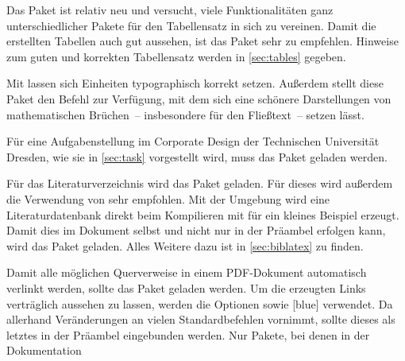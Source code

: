 \documentclass[%
  english,ngerman,%
  geometry=no,DIV=12,automark,%
]{tudscrartcl}
\begin{document}
%
\begin{Tutorial*}
\usepackage{fixltx2e}
\end{Tutorial*}
%
Das Paket  ist relativ neu und versucht, viele Funktionalitäten 
ganz unterschiedlicher Pakete für den Tabellensatz in sich zu vereinen. Damit 
die erstellten Tabellen auch gut aussehen, ist das Paket  
sehr zu empfehlen. Hinweise zum guten und korrekten Tabellensatz werden in 
\autoref{sec:tables} gegeben.
%
\begin{Tutorial*}
\usepackage{tabu}
\usepackage{booktabs}
\end{Tutorial*}
%
Mit  lassen sich Einheiten typographisch korrekt setzen. 
Außerdem stellt diese Paket den Befehl  zur Verfügung, mit dem 
sich eine schönere Darstellungen von mathematischen Brüchen~-- insbesondere für 
den Fließtext~-- setzen lässt.
%
\begin{Tutorial*}
\usepackage{units}
\end{Tutorial*}
%
Für eine Aufgabenstellung im Corporate Design der Technischen Universität 
Dresden, wie sie in \autoref{sec:task} vorgestellt wird, muss das Paket 
 geladen werden.
%
\begin{Tutorial*}
\usepackage{tudscrsupervisor}
\end{Tutorial*}
%
Für das Literaturverzeichnis wird das Paket  geladen. Für 
dieses wird außerdem die Verwendung von  sehr empfohlen. Mit 
der Umgebung  wird eine Literaturdatenbank 
 direkt beim Kompilieren mit  für ein 
kleines Beispiel erzeugt. Damit dies im Dokument selbst und nicht nur in der 
Präambel erfolgen kann, wird das Paket  geladen. Alles 
Weitere dazu ist in \autoref{sec:biblatex} zu finden.
%
\begin{Tutorial*}
\usepackage{csquotes}
\usepackage[backend=biber,style=alphabetic]{biblatex}
\usepackage{filecontents}

\end{Tutorial*}
%
Damit alle möglichen Querverweise in einem PDF-Dokument automatisch verlinkt 
werden, sollte das Paket  geladen werden. Um die erzeugten 
Links verträglich aussehen zu lassen, werden die Optionen  
sowie [blue] verwendet. Da  allerhand 
Veränderungen an vielen Standardbefehlen vornimmt, sollte dieses als letztes in 
der Präambel eingebunden werden. Nur Pakete, bei denen in der Dokumentation 
\end{document}
